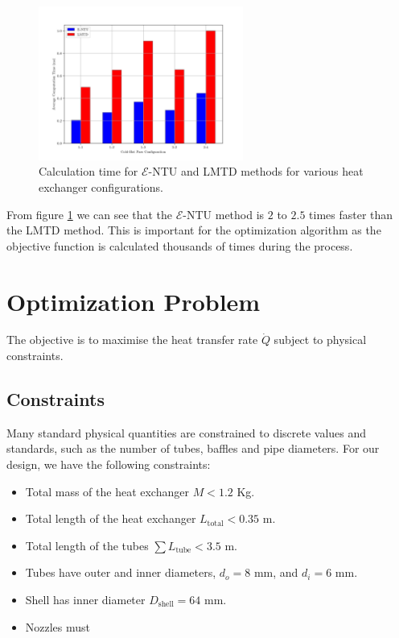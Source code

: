 \documentclass{article}
\begin{document}
\begin{figure}[H]
  \centering
  \includegraphics[width=0.6\textwidth]{entu_lmtd_speed.png}
  \caption{Calculation time for $\mathcal{E}$-NTU and LMTD methods for various heat exchanger configurations.}
  \label{fig:entu_lmtd_speed}
\end{figure}

From figure \ref{fig:entu_lmtd_speed} we can see that the $\mathcal{E}$-NTU method is $2$ to $2.5$ times faster than the LMTD method.
This is important for the optimization algorithm as the objective function is calculated thousands of times during the process.


\section{Optimization Problem}

The objective is to maximise the heat transfer rate $\dot{Q}$ subject to physical constraints.

\subsection{Constraints}

Many standard physical quantities are constrained to discrete values and standards, such as the number of tubes, baffles and pipe diameters.
For our design, we have the following constraints:
\begin{itemize}
  \item Total mass of the heat exchanger $M < 1.2$ Kg.
  \item Total length of the heat exchanger $L_{\text{total}} < 0.35$ m.
  \item Total length of the tubes $\sum L_{\text{tube}} < 3.5$ m.
  \item Tubes have outer and inner diameters, $d_{o} = 8$ mm, and $d_{i} = 6$ mm.
  \item Shell has inner diameter $D_{\text{shell}} = 64$ mm.
  \item Nozzles must 
\end{itemize}
\end{document}
